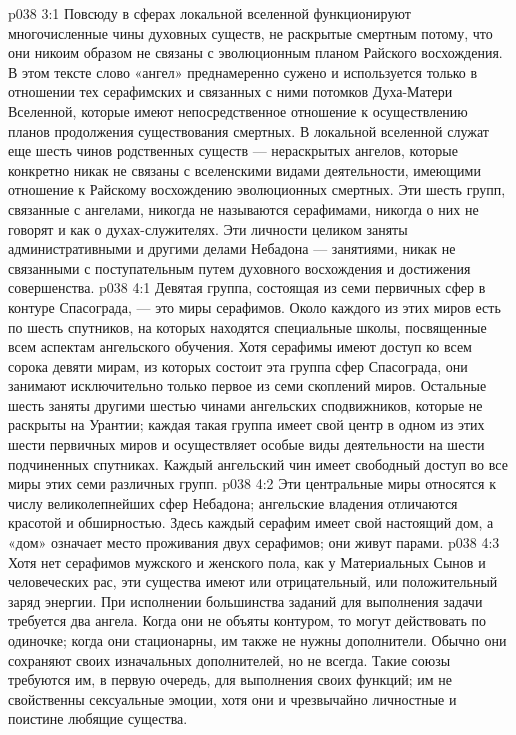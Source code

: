 \vs p038 3:1 Повсюду в сферах локальной вселенной функционируют многочисленные чины духовных существ, не раскрытые смертным потому, что они никоим образом не связаны с эволюционным планом Райского восхождения. В этом тексте слово «ангел» преднамеренно сужено и используется только в отношении тех серафимских и связанных с ними потомков Духа\hyp{}Матери Вселенной, которые имеют непосредственное отношение к осуществлению планов продолжения существования смертных. В локальной вселенной служат еще шесть чинов родственных существ --- нераскрытых ангелов, которые конкретно никак не связаны с вселенскими видами деятельности, имеющими отношение к Райскому восхождению эволюционных смертных. Эти шесть групп, связанные с ангелами, никогда не называются серафимами, никогда о них не говорят и как о духах\hyp{}служителях. Эти личности целиком заняты административными и другими делами Небадона --- занятиями, никак не связанными с поступательным путем духовного восхождения и достижения совершенства.
\vs p038 4:1 Девятая группа, состоящая из семи первичных сфер в контуре Спасограда, --- это миры серафимов. Около каждого из этих миров есть по шесть спутников, на которых находятся специальные школы, посвященные всем аспектам ангельского обучения. Хотя серафимы имеют доступ ко всем сорока девяти мирам, из которых состоит эта группа сфер Спасограда, они занимают исключительно только первое из семи скоплений миров. Остальные шесть заняты другими шестью чинами ангельских сподвижников, которые не раскрыты на Урантии; каждая такая группа имеет свой центр в одном из этих шести первичных миров и осуществляет особые виды деятельности на шести подчиненных спутниках. Каждый ангельский чин имеет свободный доступ во все миры этих семи различных групп.
\vs p038 4:2 Эти центральные миры относятся к числу великолепнейших сфер Небадона; ангельские владения отличаются красотой и обширностью. Здесь каждый серафим имеет свой настоящий дом, а «дом» означает место проживания двух серафимов; они живут парами.
\vs p038 4:3 \pc Хотя нет серафимов мужского и женского пола, как у Материальных Сынов и человеческих рас, эти существа имеют или отрицательный, или положительный заряд энергии. При исполнении большинства заданий для выполнения задачи требуется два ангела. Когда они не объяты контуром, то могут действовать по одиночке; когда они стационарны, им также не нужны дополнители. Обычно они сохраняют своих изначальных дополнителей, но не всегда. Такие союзы требуются им, в первую очередь, для выполнения своих функций; им не свойственны сексуальные эмоции, хотя они и чрезвычайно личностные и поистине любящие существа.
